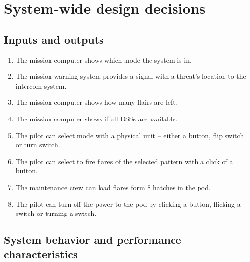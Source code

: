 \documentclass[Main]{subfiles}
\begin{document}
\chapter{System-wide design decisions}


\section{Inputs and outputs}

\begin{enumerate}[label=\bfseries DDD-1.\arabic*:]

\item The mission computer shows which mode the system is in. \label{DDD-11}

\item The mission warning system provides a signal with a threat's location to the intercom system.\label{DDD-12}

\item The mission computer shows how many flairs are left.\label{DDD-13}

\item The mission computer shows if all DSSs are available.\label{DDD-14}

\item The pilot can select mode with a physical unit -- either a button, flip switch or turn switch.\label{DDD-15}

\item The pilot can select to fire flares of the selected pattern with a click of a button.\label{DDD-16}

\item The maintenance crew can load flares form 8 hatches in the pod.\label{DDD-17}

\item The pilot can turn off the power to the pod by clicking a button, flicking a switch or turning a switch.\label{DDD-18}

\end{enumerate}




\section{System behavior and performance characteristics}
\end{document}
